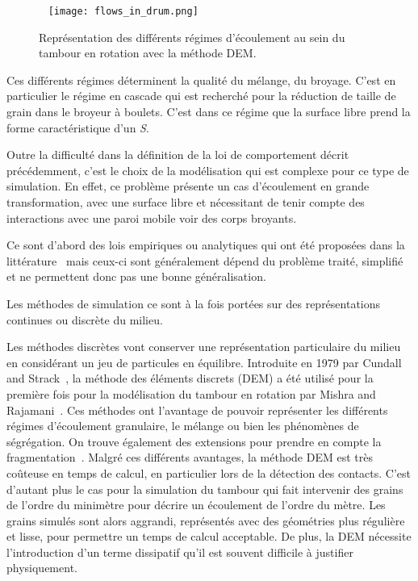 \begin{figure}~\label{fig:flow_drum}
    \centering
    \texttt{[image: flows\_in\_drum.png]}
    \caption{Représentation des différents régimes d'écoulement au sein du tambour en rotation avec la méthode DEM.}
\end{figure}

Ces différents régimes déterminent la qualité du mélange, du broyage. C'est en particulier le régime en cascade qui est recherché pour la réduction de taille de grain dans le broyeur à boulets. C'est dans ce régime que la surface libre prend la forme caractéristique d'un \textit{S}.

Outre la difficulté dans la définition de la loi de comportement décrit précédemment, c'est le choix de la modélisation qui est complexe pour ce type de simulation. En effet, ce problème présente un cas d'écoulement en grande transformation, avec une surface libre et nécessitant de tenir compte des interactions avec une paroi mobile voir des corps broyants.

Ce sont d'abord des lois empiriques ou analytiques qui ont été proposées dans la littérature~\cite{Ding2001,Boateng1998,Nicholas2001} mais ceux-ci sont généralement dépend du problème traité, simplifié et ne permettent donc pas une bonne généralisation.

Les méthodes de simulation ce sont à la fois portées sur des représentations continues ou discrète du milieu.

Les méthodes discrètes vont conserver une représentation particulaire du milieu en considérant un jeu de particules en équilibre. Introduite en 1979 par Cundall and Strack~\cite{cundall_discrete_1979}, la méthode des éléments discrets (DEM) a été utilisé pour la première fois pour la modélisation du tambour en rotation par Mishra and Rajamani~\cite{Mishra1992}. Ces méthodes ont l'avantage de pouvoir représenter les différents régimes d'écoulement granulaire, le mélange ou bien les phénomènes de ségrégation. On trouve également des extensions pour prendre en compte la fragmentation~\cite{orozco:hal-02409236}. Malgré ces différents avantages, la méthode DEM est très coûteuse en temps de calcul, en particulier lors de la détection des contacts. C'est d'autant plus le cas pour la simulation du tambour qui fait intervenir des grains de l'ordre du minimètre pour décrire un écoulement de l'ordre du mètre. Les grains simulés sont alors aggrandi, représentés avec des géométries plus régulière et lisse, pour permettre un temps de calcul acceptable.
De plus, la DEM nécessite l'introduction d'un terme dissipatif qu'il est souvent difficile à justifier physiquement.

